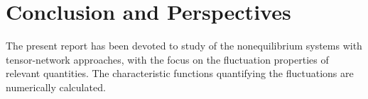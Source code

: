 \chapter{Conclusion and Perspectives}


\par The present report has been devoted to study of the nonequilibrium systems with tensor-network approaches, with the focus on the fluctuation properties of relevant quantities. The characteristic functions quantifying the fluctuations are numerically calculated.















